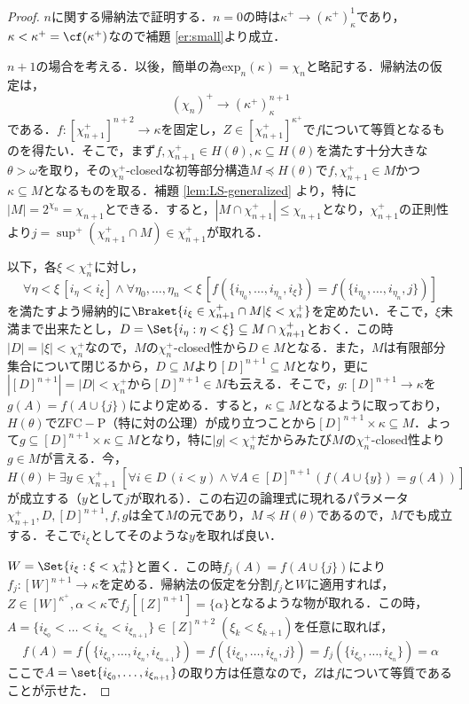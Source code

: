 \documentclass[a4j,lualatex,ja=standard]{bxjsarticle}
\begin{document}
\begin{proof}
 $n$に関する帰納法で証明する．$n = 0$の時は$\kappa^+ \longrightarrow (\kappa^+)^1_\kappa$であり，$\kappa < \kappa^+ = \cf(\kappa^+)$なので補題 \ref{er:small}より成立．

$n+1$の場合を考える．以後，簡単の為$\mathrm{exp}_n(\kappa) = \chi_n$と略記する．帰納法の仮定は，
\[
 (\chi_n)^+ \longrightarrow (\kappa^+)^{n+1}_\kappa
\]
である．$f: [\chi_{n+1}^+]^{n+2} \longrightarrow \kappa$を固定し，$Z \in [\chi_{n+1}^+]^{\kappa^+}$で$f$について等質となるものを得たい．そこで，まず$f, \chi_{n+1}^+ \in H(\theta), \kappa \subseteq H(\theta)$を満たす十分大きな$\theta > \omega$を取り，その$\chi_n^+$-closedな初等部分構造$M \preccurlyeq H(\theta)$で$f, \chi_{n+1}^+ \in M$かつ$\kappa \subseteq M$となるものを取る．補題 \ref{lem:LS-generalized} より，特に$|M| = 2^{\chi_n} = \chi_{n+1}$とできる．すると，$|M \cap \chi_{n+1}^+| \leq \chi_{n+1}$となり，$\chi_{n+1}^+$の正則性より$j = \sup^+(\chi_{n+1}^+ \cap M) \in \chi_{n+1}^+$が取れる．

 以下，各$\xi < \chi_{n}^+$に対し，
 \[
 \forall \eta < \xi \, [ i_\eta < i_\xi] \wedge \forall \eta_0, \dots, \eta_n < \xi \, [f(\{i_{\eta_0}, \dots, i_{\eta_n}, i_\xi\}) = f(\{i_{\eta_0}, \dots, i_{\eta_n}, j\})]
 \]
 を満たすよう帰納的に$\Braket{i_\xi \in \chi_{n+1}^+ \cap M | \xi < \chi_n^+}$を定めたい．そこで，$\xi$未満まで出来たとし，$D = \Set{ i_\eta : \eta < \xi} \subseteq M \cap \chi_{n+1}^+$とおく．この時$|D| = |\xi| < \chi_n^+$なので，$M$の$\chi_n^+$-closed性から$D \in M$となる．また，$M$は有限部分集合について閉じるから，$D \subseteq M$より$[D]^{n+1} \subseteq M$となり，更に$|[D]^{n+1}| = |D| < \chi_n^+$から$[D]^{n+1} \in M$も云える．そこで，$g : [D]^{n+1} \rightarrow \kappa$を$g(A) = f(A \cup \{j\})$により定める．すると，$\kappa \subseteq M$となるように取っており，$H(\theta)$で$\mathrm{ZFC}-\mathrm{P}$（特に対の公理）が成り立つことから$[D]^{n+1} \times \kappa \subseteq M$．よって$g \subseteq [D]^{n+1} \times \kappa \subseteq M$となり，特に$|g| < \chi_n^+$だからみたび$M$の$\chi_n^+$-closed性より$g \in M$が言える．今，
 \[
  H(\theta) \models
 \exists y \in \chi_{n+1}^+\;\left[ \forall i \in D\, (i < y) \wedge \forall A \in [D]^{n+1}\, (f(A \cup \{y\}) = g(A))\right]
 \]
 が成立する（$y$として$j$が取れる）．この右辺の論理式に現れるパラメータ$\chi_{n+1}^+, D, [D]^{n+1}, f, g$は全て$M$の元であり，$M \preccurlyeq H(\theta)$であるので，$M$でも成立する．そこで$i_\xi$としてそのような$y$を取れば良い．

 $W = \Set{ i_\xi : \xi < \chi_n^+}$と置く．この時$f_j(A) = f(A \cup \{j\})$により$f_j: [W]^{n+1} \rightarrow \kappa$を定める．帰納法の仮定を分割$f_j$と$W$に適用すれば，$Z \in [W]^{\kappa^+}, \alpha < \kappa$で$f_j[[Z]^{n+1}] = \{\alpha\}$となるような物が取れる．この時，$A = \{i_{\xi_0} < \dots < i_{\xi_n} < i_{\xi_{n+1}}\} \in [Z]^{n+2}\;(\xi_k < \xi_{k+1})$を任意に取れば，
 \[
  f(A) = f(\{i_{\xi_0}, \dots, i_{\xi_n}, i_{\xi_{n+1}}\})
 = f(\{i_{\xi_0}, \dots, i_{\xi_n}, j\})
 = f_j(\{i_{\xi_0}, \dots, i_{\xi_n}\}) = \alpha
 \]
 ここで$A = \set{i_{\xi_0}, \dots, i_{\xi_{n+1}}}$の取り方は任意なので，$Z$は$f$について等質であることが示せた．\mbox{}
\end{proof}
\end{document}

